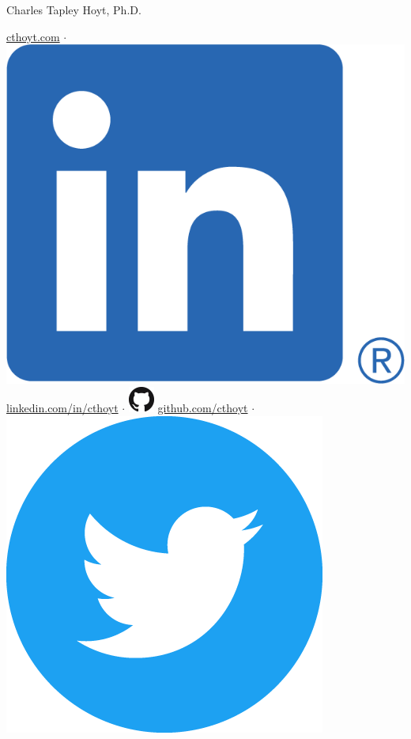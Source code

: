 \documentclass[11pt,a4paper,sans]{moderncv} %
\begin{document}
{\Huge Charles Tapley Hoyt, Ph.D.}

\vspace{3mm}

\href{https://cthoyt.com}{cthoyt.com}
$\cdot$
\includegraphics[scale=0.055]{img/LI-In-Bug.png}
\href{https://linkedin.com/in/cthoyt}{linkedin.com/in/cthoyt}
$\cdot$
\includegraphics[scale=0.25]{img/GitHub-Mark-32px.png}
\href{https://github.com/cthoyt}{github.com/cthoyt}
$\cdot$
\includegraphics[scale=0.02]{img/Twitter_Social_Icon_Circle_Color.png}
\end{document}
